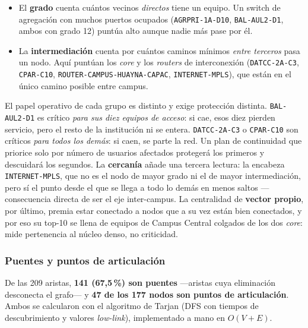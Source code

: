 \documentclass[10pt,a4paper]{extarticle}
\newcommand{\code}[1]{\texttt{\small #1}}
\begin{document}
\begin{itemize}[leftmargin=*,itemsep=1mm]
\item El \textbf{grado} cuenta cuántos vecinos \textit{directos} tiene un equipo. Un
switch de agregación con muchos puertos ocupados (\code{AGRPRI-1A-D10},
\code{BAL-AUL2-D1}, ambos con grado 12) puntúa alto aunque nadie más pase por él.
\item La \textbf{intermediación} cuenta por cuántos caminos mínimos \textit{entre terceros}
pasa un nodo. Aquí puntúan los \textit{core} y los \textit{routers} de interconexión
(\code{DATCC-2A-C3}, \code{CPAR-C10}, \code{ROUTER-CAMPUS-HUAYNA-CAPAC},
\code{INTERNET-MPLS}), que están en el único camino posible entre campus.
\end{itemize}

El papel operativo de cada grupo es distinto y exige protección distinta. \code{BAL-AUL2-D1}
es crítico \textit{para sus diez equipos de acceso}: si cae, esos diez pierden servicio,
pero el resto de la institución ni se entera. \code{DATCC-2A-C3} o \code{CPAR-C10} son
críticos \textit{para todos los demás}: si caen, se parte la red. Un plan de continuidad
que priorice solo por número de usuarios afectados protegerá los primeros y descuidará los
segundos. La \textbf{cercanía} añade una tercera lectura: la encabeza \code{INTERNET-MPLS},
que no es el nodo de mayor grado ni el de mayor intermediación, pero sí el punto desde el
que se llega a todo lo demás en menos saltos ---consecuencia directa de ser el eje
inter-campus. La centralidad de \textbf{vector propio}, por último, premia estar conectado
a nodos que a su vez están bien conectados, y por eso su top-10 se llena de equipos de
Campus Central colgados de los dos \textit{core}: mide pertenencia al núcleo denso, no
criticidad.

\subsubsection{Puentes y puntos de articulación}
\label{sec:puentes}

De las 209 aristas, \textbf{141 (67,5\,\%) son puentes} ---aristas cuya eliminación
desconecta el grafo--- y \textbf{47 de los 177 nodos son puntos de articulación}. Ambos se
calcularon con el algoritmo de Tarjan (DFS con tiempos de descubrimiento y valores
\textit{low-link}), implementado a mano en $O(V+E)$.
\end{document}
